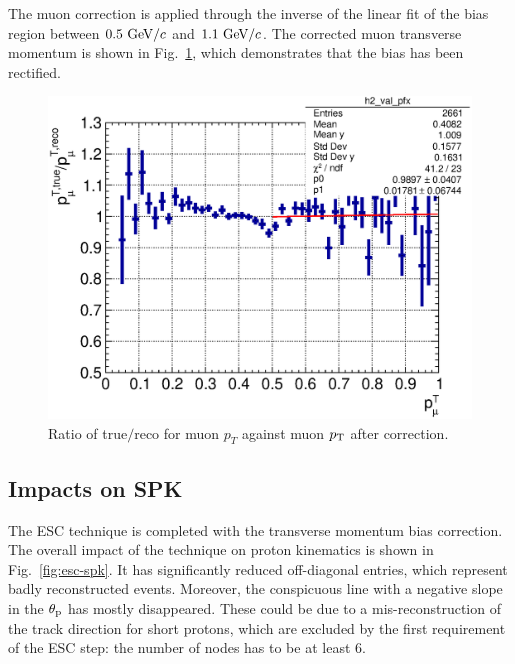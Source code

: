      The muon correction is applied through the inverse of the linear fit of the bias region between $0.5~\textrm{GeV}/c$ and $1.1~\textrm{GeV}/c$.
     The corrected muon transverse momentum is shown in Fig.~\ref{fig:esc-cormupt}, which demonstrates that the bias has been rectified.

     \begin{figure}[h]
     \centering
     \includegraphics[width=\sgfidwid\textwidth]{figures/sel/mu_pt_vs_cor_mu_pt_bias_hist2d_al14.eps} 
     \caption{Ratio of true$/$reco for muon $p_T$ against muon $p_\textrm{T}$ after correction.}
     \label{fig:esc-cormupt}
     \end{figure}

    \subsection{Impacts on SPK}
     The ESC technique is completed with the transverse momentum bias correction.
     The overall impact of the technique on proton kinematics is shown in Fig.~\ref{fig:esc-spk}.
     It has significantly reduced off-diagonal entries, which represent badly reconstructed events.
     Moreover, the conspicuous line with a negative slope in the $\theta_\textrm{p}$ has mostly disappeared.
     These could be due to a mis-reconstruction of the track direction for short protons, which are excluded by the first requirement of the ESC step: the number of nodes has to be at least $6$.
     
